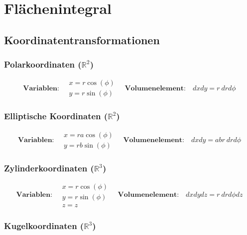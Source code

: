 \documentclass[11pt]{article}
\begin{document}
\section{Fl{\"a}chenintegral}

\subsection{Koordinatentransformationen}

\subsubsection{Polarkoordinaten ($\mathbb{R}^2$)}

\begin{equation*}
	\textbf{Variablen:}\quad \begin{matrix}
		x = r\cos(\phi) \\ y = r\sin(\phi)
	\end{matrix} \quad \textbf{Volumenelement:}\quad dxdy = r\ drd\phi
\end{equation*}

\subsubsection{Elliptische Koordinaten ($\mathbb{R}^2$)}

\begin{equation*}
	\textbf{Variablen:}\quad \begin{matrix}
		x = ra\cos(\phi) \\ y = rb\sin(\phi)
	\end{matrix} \quad \textbf{Volumenelement:}\quad dxdy = abr\ drd\phi
\end{equation*}

\subsubsection{Zylinderkoordinaten ($\mathbb{R}^3$)}

\begin{equation*}
	\textbf{Variablen:}\quad \begin{matrix}
		x = r\cos(\phi) \\ y = r\sin(\phi) \\ z = z
	\end{matrix} \quad \textbf{Volumenelement:}\quad dxdydz = r\ drd\phi dz
\end{equation*}

\subsubsection{Kugelkoordinaten ($\mathbb{R}^3$)}
\end{document}
